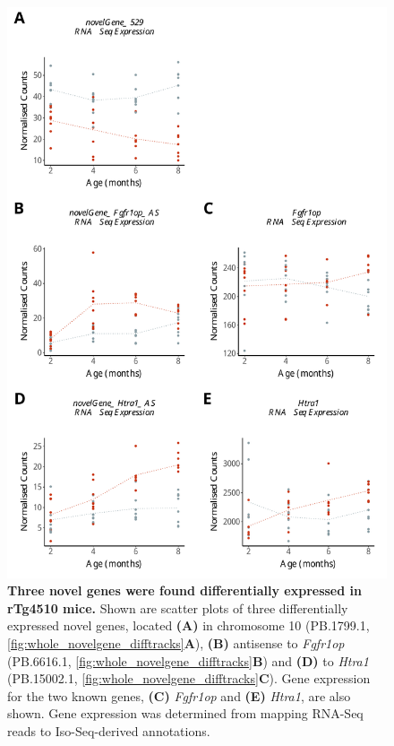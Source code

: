 \begin{figure}[!htp]
	\begin{center}
		\includegraphics[page=1,scale = 0.55]{Figures/NovelGeneExp.pdf}
	\end{center}
	\captionsetup{width=0.95\textwidth}
	\caption[Differentially expressed novel genes associated with progressive tau pathology]%
	{\textbf{Three novel genes were found differentially expressed in rTg4510 mice.} Shown are scatter plots of three differentially expressed novel genes, located \textbf{(A)} in chromosome 10 (PB.1799.1, \cref{fig:whole_novelgene_difftracks}\textbf{A}), \textbf{(B)} antisense to \textit{Fgfr1op} (PB.6616.1, \cref{fig:whole_novelgene_difftracks}\textbf{B}) and \textbf{(D)} to \textit{Htra1} (PB.15002.1, \cref{fig:whole_novelgene_difftracks}\textbf{C}). Gene expression for the two known genes, \textbf{(C)} \textit{Fgfr1op} and \textbf{(E)} \textit{Htra1}, are also shown. Gene expression was determined from mapping RNA-Seq reads to Iso-Seq-derived annotations.}   
	\label{fig:whole_novelgene_diffexp}
\end{figure}


